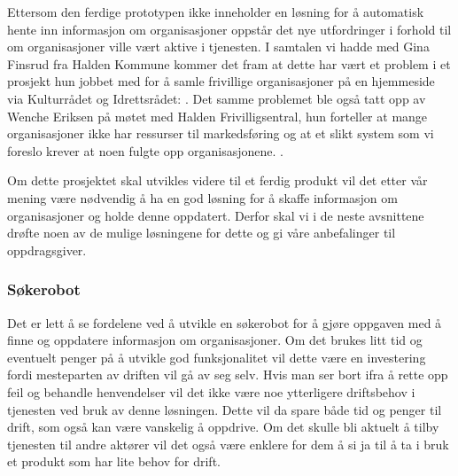 Ettersom den ferdige prototypen ikke inneholder en løsning for å automatisk hente inn informasjon om organisasjoner oppstår det nye utfordringer i forhold til om organisasjoner ville vært aktive i tjenesten. I samtalen vi hadde med Gina Finsrud fra Halden Kommune kommer det fram at dette har vært et problem i et prosjekt hun jobbet med for å samle frivillige organisasjoner på en hjemmeside via Kulturrådet og Idrettsrådet:  \cite{KOMMUNEN-INTERVJU:20}. Det samme problemet ble også tatt opp av Wenche Eriksen på møtet med Halden Frivilligsentral, hun forteller at mange organisasjoner ikke har ressurser til markedsføring og at et slikt system som vi foreslo krever at noen fulgte opp organisasjonene. \cite{FRIVILLIGSENTRALEN-INTERVJU:21}.

Om dette prosjektet skal utvikles videre til et ferdig produkt vil det etter vår mening være nødvendig å ha en god løsning for å skaffe informasjon om organisasjoner og holde denne oppdatert. Derfor skal vi i de neste avsnittene drøfte noen av de mulige løsningene for dette og gi våre anbefalinger til oppdragsgiver.

\subsubsection{Søkerobot}
Det er lett å se fordelene ved å utvikle en søkerobot for å gjøre oppgaven med å finne og oppdatere informasjon om organisasjoner. Om det brukes litt tid og eventuelt penger på å utvikle god funksjonalitet vil dette være en investering fordi mesteparten av driften vil gå av seg selv. Hvis man ser bort ifra å rette opp feil og behandle henvendelser vil det ikke være noe ytterligere driftsbehov i tjenesten ved bruk av denne løsningen. Dette vil da spare både tid og penger til drift, som også kan være vanskelig å oppdrive. Om det skulle bli aktuelt å tilby tjenesten til andre aktører vil det også være enklere for dem å si ja til å ta i bruk et produkt som har lite behov for drift.

